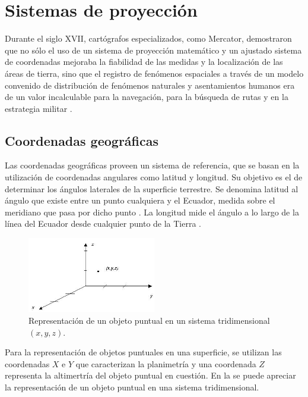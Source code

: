 \section{Sistemas de proyección}
\label{sec:cap2-sistemas-de-proyeccion}
Durante el siglo XVII, cartógrafos especializados, como Mercator, demostraron que no sólo el uso de
un sistema de proyección matemático y un ajustado sistema de coordenadas mejoraba la fiabilidad de
las medidas y la localización de las áreas de tierra, sino que el registro de fenómenos espaciales
a través de un modelo convenido de distribución de fenómenos naturales y asentamientos humanos era
de un valor incalculable para la navegación, para la búsqueda de rutas y en la estrategia militar
\citep{llopis2006sistemas}.

\subsection{Coordenadas geográficas}
Las coordenadas geográficas proveen un sistema de referencia, que se basan en la utilización de
coordenadas angulares como latitud y longitud. Su objetivo es el de determinar los ángulos
laterales de la superficie terrestre. Se denomina latitud al ángulo que existe entre un punto
cualquiera y el Ecuador, medida sobre el meridiano que pasa por dicho punto \citep{fAlonsoSig2006}.
La longitud mide el ángulo a lo largo de la línea del Ecuador desde cualquier punto de la Tierra
\citep{fAlonsoSig2006}.

\begin{figure}
\centering
\includegraphics[width=0.5\textwidth]{capitulo-2/graphics/coordenadas-xyz.jpg}
\caption{\label{fig:sig-xyz} Representación de un objeto puntual en un sistema tridimensional
 $(x,y,z)$.}
\end{figure}

Para la representación de objetos puntuales en una superficie, se utilizan las coordenadas $X$ e
$Y$ que caracterizan la planimetría y una coordenada $Z$ representa la altimertría del objeto
puntual en cuestión. En la  se puede apreciar la representación de un objeto
puntual en una sistema tridimensional.

